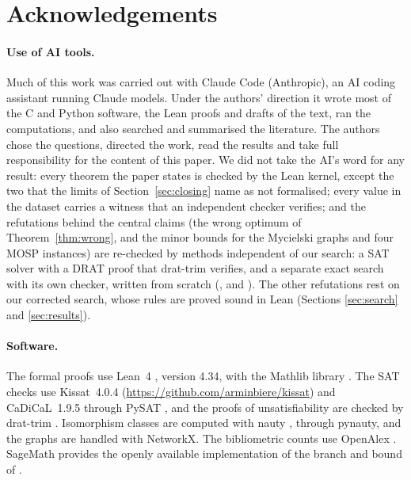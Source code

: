 \section*{Acknowledgements}

\paragraph{Use of AI tools.} Much of this work was carried out with Claude Code
(Anthropic), an AI coding assistant running Claude models. Under the authors'
direction it wrote most of the C and Python software, the Lean proofs and drafts of the
text, ran the computations, and also searched and summarised the literature. The
authors chose the questions, directed the work, read the results and take full
responsibility for the content of this paper. We did not take the AI's word for any result: every theorem the paper states
is checked by the Lean kernel, except the two that the limits of
Section~\ref{sec:closing} name as not formalised; every value in
the dataset carries a witness that an independent checker verifies; and the
refutations behind the central claims (the wrong optimum of
Theorem~\ref{thm:wrong}, and the minor bounds for the Mycielski graphs and four
MOSP instances) are re-checked by methods independent of our search: a SAT solver with a DRAT
proof that drat-trim verifies, and a separate exact search with its own
checker, written from scratch (,
 and
).
The other refutations rest on our corrected search, whose rules are proved
sound in Lean (Sections \ref{sec:search} and \ref{sec:results}).

\paragraph{Software.} The formal proofs use Lean~4 \citep{MouraUllrich2021},
version 4.34, with the Mathlib library \citep{Mathlib2020}. The SAT checks use
Kissat~4.0.4 (\url{https://github.com/arminbiere/kissat}) and
CaDiCaL~1.9.5 \citep{CaDiCaL2024} through PySAT \citep{PySAT2018}, and the
proofs of unsatisfiability are checked by drat-trim \citep{WetzlerHeuleHunt2014}.
Isomorphism classes are computed with nauty \citep{McKayPiperno2014}, through
pynauty, and the graphs are handled with NetworkX. The bibliometric counts use
OpenAlex \citep{Priem2022}. SageMath provides the openly available
implementation of the branch and bound of \citet{CoudertMazauricNisse2016}.
